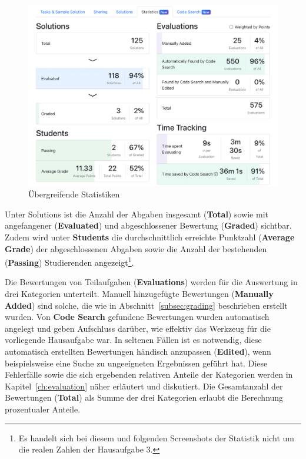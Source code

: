 \begin{figure}
    \centering
    \includegraphics[width=\textwidth]{images/assignment-statistics-basics}
    \caption{Übergreifende Statistiken}
    \label{fig:assignment-statistics-basics}
\end{figure}

Unter Solutions ist die Anzahl der Abgaben insgesamt (\textbf{Total}) sowie mit angefangener (\textbf{Evaluated}) und abgeschlossener Bewertung (\textbf{Graded}) sichtbar.
Zudem wird unter \textbf{Students} die durchschnittlich erreichte Punktzahl (\textbf{Average Grade}) der abgeschlossenen Abgaben sowie die Anzahl der bestehenden (\textbf{Passing}) Studierenden angezeigt\footnote{
    Es handelt sich bei diesem und folgenden Screenshots der Statistik nicht um die realen Zahlen der Hausaufgabe 3.
}.

Die Bewertungen von Teilaufgaben (\textbf{Evaluations}) werden für die Auswertung in drei Kategorien unterteilt.
Manuell hinzugefügte Bewertungen (\textbf{Manually Added}) sind solche, die wie in Abschnitt~\ref{subsec:grading} beschrieben erstellt wurden.
Von \textbf{Code Search} gefundene Bewertungen wurden automatisch angelegt und geben Aufschluss darüber, wie effektiv das Werkzeug für die vorliegende Hausaufgabe war.
In seltenen Fällen ist es notwendig, diese automatisch erstellten Bewertungen händisch anzupassen (\textbf{Edited}), wenn beispielsweise eine Suche zu ungeeigneten Ergebnissen geführt hat.
Diese Fehlerfälle sowie die sich ergebenden relativen Anteile der Kategorien werden in Kapitel~\ref{ch:evaluation} näher erläutert und diskutiert.
Die Gesamtanzahl der Bewertungen (\textbf{Total}) als Summe der drei Kategorien erlaubt die Berechnung prozentualer Anteile.

